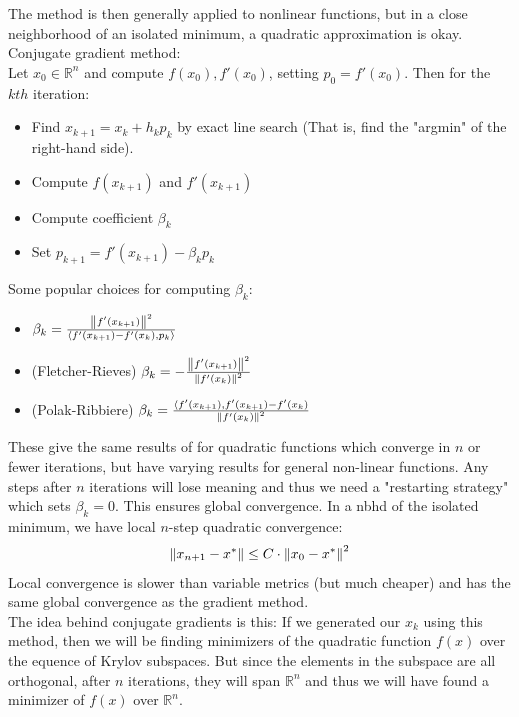 \documentclass[12pt,a4paper]{article}
\begin{document}
	The method is then generally applied to nonlinear functions, but in a close neighborhood of an isolated minimum, a quadratic approximation is okay. \\
	Conjugate gradient method:\\
	Let $x_0 \in \mathbb{R}^n$ and compute $f(x_0), f'(x_0)$, setting $p_0 = f'(x_0)$. Then for the $kth$ iteration:
	\begin{itemize}
		\item Find $x_{k+1} = x_k + h_kp_k$ by exact line search (That is, find the "argmin" of the right-hand side).
		\item Compute $f(x_{k+1})$ and $f'(x_{k+1})$
		\item Compute coefficient $\beta_k$
		\item Set $p_{k+1} = f'(x_{k+1}) - \beta_kp_k$
	\end{itemize}
	Some popular choices for computing $\beta_k$:
	\begin{itemize}
		\item $\beta_k = \frac{\norm{f'(x_{k+1})}^2}{\langle f'(x_{k+1}) - f'(x_k), p_k \rangle}$
		\item (Fletcher-Rieves) $\beta_k = -\frac{\norm{f'(x_{k+1})}^2}{\norm{f'(x_k)}^2}$
		\item (Polak-Ribbiere) $\beta_k = \frac{\langle f'(x_{k+1}), f'(x_{k+1}) - f'(x_k)}{\norm{f'(x_k)}^2}$
	\end{itemize}
	These give the same results of for quadratic functions which converge in $n$ or fewer iterations, but have varying results for general non-linear functions. Any steps after $n$ iterations will lose meaning and thus we need a "restarting strategy" which sets $\beta_k=0$. This ensures global convergence. In a nbhd of the isolated minimum, we have local $n$-step quadratic convergence:
	\begin{align*}
		\norm{x_{n+1} - x^*} \leq C \cdot \norm{x_0 - x^*}^2
	\end{align*}
	Local convergence is slower than variable metrics (but much cheaper) and has the same global convergence as the gradient method.\\
	The idea behind conjugate gradients is this: If we generated our $x_k$ using this method, then we will be finding minimizers of the quadratic function $f(x)$ over the equence of Krylov subspaces. But since the elements in the subspace are all orthogonal, after $n$ iterations, they will span $\mathbb{R}^n$ and thus we will have found a minimizer of $f(x)$ over $\mathbb{R}^n$. 
	
\end{document}
